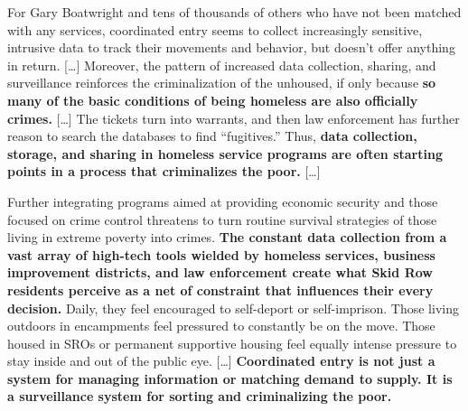 \documentclass{article}
\renewenvironment{leftbar}
{\vspace{6pt}\def\FrameCommand{\hspace{0em}\vrule width 0.5pt \hspace{1em}}\MakeFramed {\advance\hsize-\width \FrameRestore}}
{\endMakeFramed}
\begin{document}
\begin{leftbar}
For Gary Boatwright and tens of thousands of others who have not been
matched with any services, coordinated entry seems to collect
increasingly sensitive, intrusive data to track their movements and
behavior, but doesn't offer anything in return. {[}\ldots{]} Moreover,
the pattern of increased data collection, sharing, and surveillance
reinforces the criminalization of the unhoused, if only because
\textbf{so many of the basic conditions of being homeless are also
officially crimes.} {[}\ldots{]} The tickets turn into warrants, and
then law enforcement has further reason to search the databases to find
``fugitives.'' Thus, \textbf{data collection, storage, and sharing in
homeless service programs are often starting points in a process that
criminalizes the poor.} {[}\ldots{]}

Further integrating programs aimed at providing economic security and
those focused on crime control threatens to turn routine survival
strategies of those living in extreme poverty into crimes. \textbf{The
constant data collection from a vast array of high-tech tools wielded by
homeless services, business improvement districts, and law enforcement
create what Skid Row residents perceive as a net of constraint that
influences their every decision.} Daily, they feel encouraged to
self-deport or self-imprison. Those living outdoors in encampments feel
pressured to constantly be on the move. Those housed in SROs or
permanent supportive housing feel equally intense pressure to stay
inside and out of the public eye. {[}\ldots{]} \textbf{Coordinated entry
is not just a system for managing information or matching demand to
supply. It is a surveillance system for sorting and criminalizing the
poor.} \cite{eubanksAutomatingInequalityHow2019} 
\end{leftbar}
\end{document}

